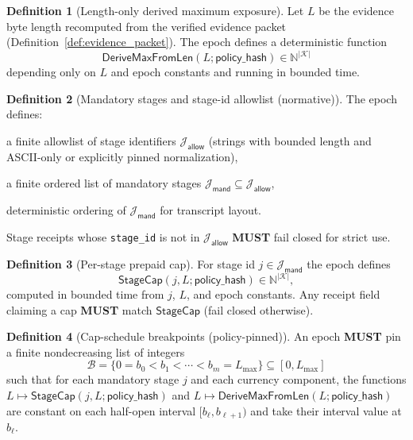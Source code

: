 \documentclass[11pt]{article}
\newcommand{\MUST}{\textbf{MUST}}
\newcommand{\code}[1]{\texttt{#1}}
\newcommand{\N}{\mathbb{N}}
\newcommand{\1}{\mathbf{1}}
\theoremstyle{definition}
\newtheorem{definition}{Definition}
\theoremstyle{plain}
\begin{document}
\begin{definition}[Length-only derived maximum exposure]
\label{def:derive_max}
Let $L$ be the evidence byte length recomputed from the verified evidence packet (Definition~\ref{def:evidence_packet}). The epoch defines a deterministic function
\[
\mathsf{DeriveMaxFromLen}(L;\textsf{policy\_hash})\in\N^{|\mathcal{K}|}
\]
depending only on $L$ and epoch constants and running in bounded time.
\end{definition}

\begin{definition}[Mandatory stages and stage-id allowlist (normative)]
\label{def:mand_stages}
The epoch defines:
\begin{tightitemize}
\item a finite allowlist of stage identifiers $\mathcal{J}_{\textsf{allow}}$ (strings with bounded length and ASCII-only or explicitly pinned normalization),
\item a finite ordered list of mandatory stages $\mathcal{J}_{\textsf{mand}}\subseteq \mathcal{J}_{\textsf{allow}}$,
\item deterministic ordering of $\mathcal{J}_{\textsf{mand}}$ for transcript layout.
\end{tightitemize}
Stage receipts whose \code{stage\_id} is not in $\mathcal{J}_{\textsf{allow}}$ \MUST{} fail closed for strict use.
\end{definition}

\begin{definition}[Per-stage prepaid cap]
\label{def:stagecap}
For stage id $j\in\mathcal{J}_{\textsf{mand}}$ the epoch defines
\[
\mathsf{StageCap}(j,L;\textsf{policy\_hash})\in\N^{|\mathcal{K}|},
\]
computed in bounded time from $j$, $L$, and epoch constants.
Any receipt field claiming a cap \MUST{} match $\mathsf{StageCap}$ (fail closed otherwise).
\end{definition}

\begin{definition}[Cap-schedule breakpoints (policy-pinned)]
\label{def:cap_breakpoints}
An epoch \MUST{} pin a finite nondecreasing list of integers
\[
\mathcal{B}=\{0=b_0<b_1<\cdots<b_m=L_{\max}\}\subseteq [0,L_{\max}]
\]
such that for each mandatory stage $j$ and each currency component, the functions
$L\mapsto \mathsf{StageCap}(j,L;\textsf{policy\_hash})$ and $L\mapsto \mathsf{DeriveMaxFromLen}(L;\textsf{policy\_hash})$
are constant on each half-open interval $[b_\ell,b_{\ell+1})$ and take their interval value at $b_\ell$.
\end{definition}
\end{document}

